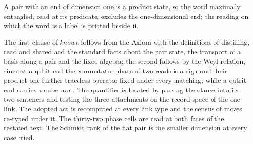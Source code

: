 \begin{chtheorem}\label{box:I-1-axiom-and-the-six-definitions:9}
A pair with an end of dimension one is a product state, so the word maximally entangled, read at its predicate, excludes the one-dimensional end; the reading on which the word is a label is printed beside it.
\end{chtheorem}
The first clause of \emph{known} follows from the Axiom with the definitions of distilling, read and shared and the standard facts about the pair state, the transport of a basis along a pair and the fixed algebra; the second follows by the Weyl relation, since at a qubit end the commutator phase of two reads is a sign and their product one further traceless operator fixed under every matching, while a qutrit end carries a cube root. The quantifier is located by parsing the clause into its two sentences and testing the three attachments on the record space of the one link. The adopted act is recomputed at every link type and the census of moves re-typed under it. The thirty-two phase cells are read at both faces of the restated text. The Schmidt rank of the flat pair is the smaller dimension at every case tried.

